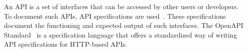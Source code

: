 An API is a set of interfaces that can be accessed by other users or developers.
To document such APIs, API specifications are used~\cite{de_api_2017}.
These specifications document the functioning and expected output of such interfaces.
The OpenAPI Standard~\cite{swagger_openapi_2021} is a specification language
that offers a standardized way of writing API specifications for HTTP-based APIs.